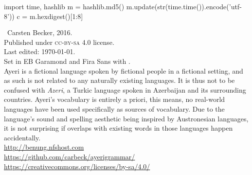\begin{pycode}[env1]
import time, hashlib
m = hashlib.md5()
m.update(str(time.time()).encode('utf-8'))
c = m.hexdigest()[1:8]
\end{pycode}

\begin{minipage}[b][\textheight][b]{0.67\textwidth}\small
\ccbysa~Carsten Becker, 2016.\\
Published under \textsc{cc-by-sa} 4.0 license.\\
Last edited: \today{}.\\[.5\baselineskip]

Set in EB Garamond and {\sffamily Fira Sans} with \XeTeX{}.\\[.5\baselineskip]

Ayeri is a fictional language spoken by fictional people in a fictional setting, and as such is not related to any naturally existing languages. It is thus not to be confused with \emph{Azeri}, a Turkic language spoken in Azerbaijan and its surrounding countries. Ayeri’s vocabulary is entirely a priori, this means, no real-world languages have been used specifically as sources of vocabulary. Due to the language’s sound and spelling aesthetic being inspired by Austronesian languages, it is not surprising if overlaps with existing words in those languages happen accidentally.\\[.5\baselineskip]

\href{http://benung.nfshost.com}{http://benung.nfshost.com}\\
\href{https://github.com/carbeck/ayerigrammar}{https://github.com/carbeck/ayerigrammar/}\\
\href{https://creativecommons.org/licenses/by-sa/4.0/}{https://creativecommons.org/licenses/by-sa/4.0/}\\%

\begin{center}\tiny
\texttt{}
\end{center}
\end{minipage}
